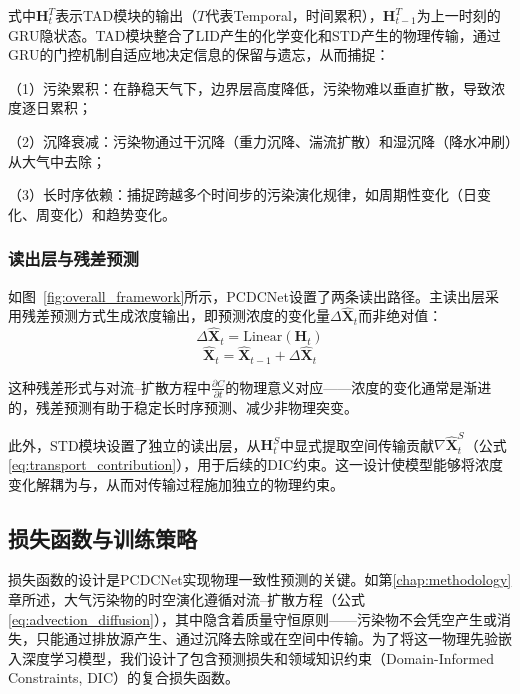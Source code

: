 \noindent 式中$\mathbf{H}_t^T$表示TAD模块的输出（$T$代表Temporal，时间累积），$\mathbf{H}_{t-1}^T$为上一时刻的GRU隐状态。TAD模块整合了LID产生的化学变化和STD产生的物理传输，通过GRU的门控机制自适应地决定信息的保留与遗忘，从而捕捉：

（1）污染累积：在静稳天气下，边界层高度降低，污染物难以垂直扩散，导致浓度逐日累积；

（2）沉降衰减：污染物通过干沉降（重力沉降、湍流扩散）和湿沉降（降水冲刷）从大气中去除；

（3）长时序依赖：捕捉跨越多个时间步的污染演化规律，如周期性变化（日变化、周变化）和趋势变化。


\subsubsection{读出层与残差预测}
如图~\ref{fig:overall_framework}所示，PCDCNet设置了两条读出路径。主读出层采用残差预测方式生成浓度输出，即预测浓度的变化量$\Delta\hat{\mathbf{X}}_t$而非绝对值：
\begin{equation}
    \Delta \hat{\mathbf{X}}_t = \text{Linear}(\mathbf{H}_t)
\end{equation}
\begin{equation}
    \hat{\mathbf{X}}_t = \hat{\mathbf{X}}_{t-1} + \Delta \hat{\mathbf{X}}_t
\label{eq:residual_pred}
\end{equation}

\noindent 这种残差形式与对流--扩散方程中$\frac{\partial C}{\partial t}$的物理意义对应——浓度的变化通常是渐进的，残差预测有助于稳定长时序预测、减少非物理突变。

此外，STD模块设置了独立的读出层，从$\mathbf{H}_t^S$中显式提取空间传输贡献$\nabla\hat{\mathbf{X}}_t^S$（公式\eqref{eq:transport_contribution}），用于后续的DIC约束。这一设计使模型能够将浓度变化解耦为与，从而对传输过程施加独立的物理约束。


\subsection{损失函数与训练策略}
\label{subsec:pcdcnet_training}

损失函数的设计是PCDCNet实现物理一致性预测的关键。如第\ref{chap:methodology}章所述，大气污染物的时空演化遵循对流--扩散方程（公式\eqref{eq:advection_diffusion}），其中隐含着质量守恒原则——污染物不会凭空产生或消失，只能通过排放源产生、通过沉降去除或在空间中传输。为了将这一物理先验嵌入深度学习模型，我们设计了包含预测损失和领域知识约束（Domain-Informed Constraints, DIC）的复合损失函数。

